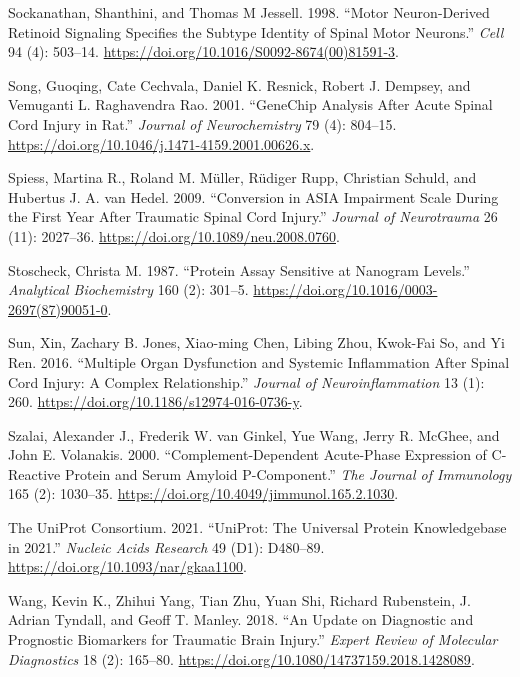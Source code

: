 \documentclass[9pt,lineno]{elife}
\newlength{\cslhangindent}
\newlength{\cslentryspacingunit} %
\newenvironment{CSLReferences}[2] %
 {%
  \setlength{\parindent}{0pt}
  \ifodd #1
  \let\oldpar\par
  \def\par{\hangindent=\cslhangindent\oldpar}
  \fi
  \setlength{\parskip}{#2\cslentryspacingunit}
 }%
 {}
\begin{document}
\begin{landscape}
\begin{landscape}
\begin{CSLReferences}{1}{0}
\leavevmode{}%
Sockanathan, Shanthini, and Thomas M Jessell. 1998. {``Motor {Neuron-Derived Retinoid Signaling Specifies} the {Subtype Identity} of {Spinal Motor Neurons}.''} \emph{Cell} 94 (4): 503--14. \url{https://doi.org/10.1016/S0092-8674(00)81591-3}.

\leavevmode{}%
Song, Guoqing, Cate Cechvala, Daniel K. Resnick, Robert J. Dempsey, and Vemuganti L. Raghavendra Rao. 2001. {``{GeneChip} Analysis After Acute Spinal Cord Injury in Rat.''} \emph{Journal of Neurochemistry} 79 (4): 804--15. \url{https://doi.org/10.1046/j.1471-4159.2001.00626.x}.

\leavevmode{}%
Spiess, Martina R., Roland M. Müller, Rüdiger Rupp, Christian Schuld, and Hubertus J. A. van Hedel. 2009. {``Conversion in {ASIA Impairment Scale} During the First Year After Traumatic Spinal Cord Injury.''} \emph{Journal of Neurotrauma} 26 (11): 2027--36. \url{https://doi.org/10.1089/neu.2008.0760}.

\leavevmode{}%
Stoscheck, Christa M. 1987. {``Protein Assay Sensitive at Nanogram Levels.''} \emph{Analytical Biochemistry} 160 (2): 301--5. \url{https://doi.org/10.1016/0003-2697(87)90051-0}.

\leavevmode{}%
Sun, Xin, Zachary B. Jones, Xiao-ming Chen, Libing Zhou, Kwok-Fai So, and Yi Ren. 2016. {``Multiple Organ Dysfunction and Systemic Inflammation After Spinal Cord Injury: A Complex Relationship.''} \emph{Journal of Neuroinflammation} 13 (1): 260. \url{https://doi.org/10.1186/s12974-016-0736-y}.

\leavevmode{}%
Szalai, Alexander J., Frederik W. van Ginkel, Yue Wang, Jerry R. McGhee, and John E. Volanakis. 2000. {``Complement-{Dependent Acute-Phase Expression} of {C-Reactive Protein} and {Serum Amyloid P-Component}.''} \emph{The Journal of Immunology} 165 (2): 1030--35. \url{https://doi.org/10.4049/jimmunol.165.2.1030}.

\leavevmode{}%
The UniProt Consortium. 2021. {``{UniProt}: The Universal Protein Knowledgebase in 2021.''} \emph{Nucleic Acids Research} 49 (D1): D480--89. \url{https://doi.org/10.1093/nar/gkaa1100}.

\leavevmode{}%
Wang, Kevin K., Zhihui Yang, Tian Zhu, Yuan Shi, Richard Rubenstein, J. Adrian Tyndall, and Geoff T. Manley. 2018. {``An Update on Diagnostic and Prognostic Biomarkers for Traumatic Brain Injury.''} \emph{Expert Review of Molecular Diagnostics} 18 (2): 165--80. \url{https://doi.org/10.1080/14737159.2018.1428089}.


\end{CSLReferences}
\end{landscape}
\end{landscape}
\end{document}
